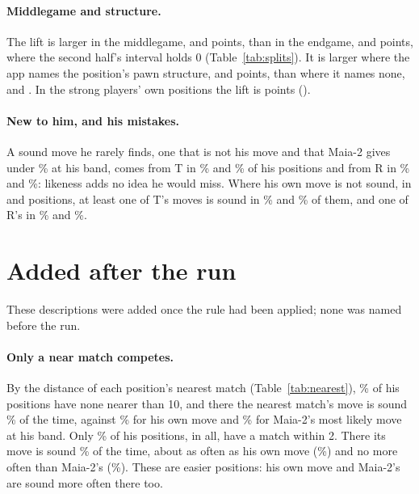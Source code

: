 \documentclass[11pt]{article}
\begin{document}
\SplitTable

\paragraph{Middlegame and structure.} The lift is larger in the middlegame, \MidLiftFirst{} and
\MidLiftSecond{} points, than in the endgame, \EndLiftFirst{} and \EndLiftSecond{} points, where
the second half's interval holds 0 (Table~\ref{tab:splits}). It is larger where the app names the
position's pawn structure, \NamedLiftFirst{} and \NamedLiftSecond{} points, than where it names
none, \NoneLiftFirst{} and \NoneLiftSecond. In the strong players' own positions the lift is
\StrongLift{} points (\StrongLiftCi).

\MoreTable

\paragraph{New to him, and his mistakes.} A sound move he rarely finds, one that is not his move
and that Maia-2 gives under \Hard\% at his band, comes from T in \NewTFirst\% and \NewTSecond\% of
his positions and from R in \NewRFirst\% and \NewRSecond\%: likeness adds no idea he would miss.
Where his own move is not sound, in \WrongFirst{} and \WrongSecond{} positions, at least one of
T's moves is sound in \WrongTFirst\% and \WrongTSecond\% of them, and one of R's in \WrongRFirst\%
and \WrongRSecond\%.

\section{Added after the run}

These descriptions were added once the rule had been applied; none was named before the run.

\NearestTable

\paragraph{Only a near match competes.} By the distance of each position's nearest match
(Table~\ref{tab:nearest}), \FarShare\% of his positions have none nearer than 10, and there the
nearest match's move is sound \FarSound\% of the time, against \FarA\% for his own move and
\FarMaia\% for Maia-2's most likely move at his band. Only \NearTwoShare\% of his positions,
\NearTwoCount{} in all, have a match within 2. There its move is sound \NearTwoSound\% of the
time, about as often as his own move (\NearTwoA\%) and no more often than Maia-2's
(\NearTwoMaia\%). These are easier positions: his own move and Maia-2's are sound more often there
too.
\end{document}
